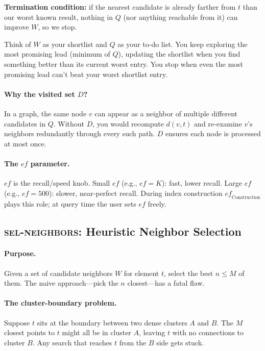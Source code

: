 \documentclass[11pt]{article}
\newcommand{\ef}{\mathit{ef}}
\theoremstyle{definition}
\begin{document}
\textbf{Termination condition:} if the nearest candidate is already farther from $t$ than our worst known result, nothing in $Q$ (nor anything reachable from it) can improve $W$, so we stop.

\begin{intubox}
Think of $W$ as your shortlist and $Q$ as your to-do list. You keep exploring the most promising lead (minimum of $Q$), updating the shortlist when you find something better than its current worst entry. You stop when even the most promising lead can't beat your worst shortlist entry.
\end{intubox}

\paragraph{Why the visited set $D$?} In a graph, the same node $v$ can appear as a neighbor of multiple different candidates in $Q$. Without $D$, you would recompute $d(v, t)$ and re-examine $v$'s neighbors redundantly through every such path. $D$ ensures each node is processed at most once.

\paragraph{The $\ef$ parameter.} $\ef$ is the recall/speed knob. Small $\ef$ (e.g., $\ef = K$): fast, lower recall. Large $\ef$ (e.g., $\ef = 500$): slower, near-perfect recall. During index construction $\ef_{\mathrm{Construction}}$ plays this role; at query time the user sets $\ef$ freely.

\subsection{\textsc{sel-neighbors}: Heuristic Neighbor Selection}
\label{sec:sel-neighbors}

\paragraph{Purpose.} Given a set of candidate neighbors $W$ for element $t$, select the best $n \leq M$ of them. The naive approach---pick the $n$ closest---has a fatal flaw.

\paragraph{The cluster-boundary problem.} Suppose $t$ sits at the boundary between two dense clusters $A$ and $B$. The $M$ closest points to $t$ might all be in cluster $A$, leaving $t$ with no connections to cluster $B$. Any search that reaches $t$ from the $B$ side gets stuck.
\end{document}
